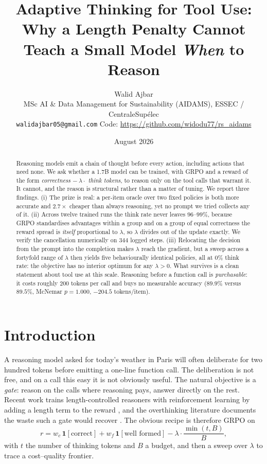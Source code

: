 \documentclass[10pt,twocolumn]{article}
\title{\vspace{-2.2em}\textbf{Adaptive Thinking for Tool Use:}\\[2pt]
\large Why a Length Penalty Cannot Teach a Small Model \emph{When} to Reason}
\author{Walid Ajbar\\[2pt]
\small MSc AI \& Data Management for Sustainability (AIDAMS), ESSEC / CentraleSup\'elec\\
\small \texttt{walidajbar05@gmail.com} \quad Code: \url{https://github.com/widodu77/rs_aidams}}
\date{\vspace{-0.6em}\small August 2026}
\newcommand{\lam}{\lambda}
\begin{document}
\maketitle

\begin{abstract}
\noindent
Reasoning models emit a chain of thought before every action, including actions
that need none. We ask whether a 1.7B model can be trained, with GRPO and a
reward of the form \emph{correctness $-\ \lam\cdot$ think tokens}, to reason only
on the tool calls that warrant it. It cannot, and the reason is structural rather
than a matter of tuning. We report three findings. (i) The prize is real: a
per-item oracle over two fixed policies is both more accurate and $2.7\times$
cheaper than always reasoning, yet no prompt we tried collects any of it.
(ii) Across twelve trained runs the think rate never leaves $96$--$99\%$, because
GRPO standardises advantages within a group and on a group of equal correctness
the reward spread is \emph{itself} proportional to $\lam$, so $\lam$ divides out
of the update exactly. We verify the cancellation numerically on $344$ logged
steps. (iii) Relocating the decision from the prompt into the completion makes
$\lam$ reach the gradient, but a sweep across a fortyfold range of $\lam$ then
yields five behaviourally identical policies, all at $0\%$ think rate: the
objective has no interior optimum for any $\lam>0$. What survives is a clean
statement about tool use at this scale. Reasoning before a function call is
\emph{purchasable}: it costs roughly $200$ tokens per call and buys no measurable
accuracy ($89.9\%$ versus $89.5\%$, McNemar $p{=}1.000$, $-204.5$ tokens/item).
\end{abstract}

\section{Introduction}

A reasoning model asked for today's weather in Paris will often deliberate for
two hundred tokens before emitting a one-line function call. The deliberation is
not free, and on a call this easy it is not obviously useful. The natural
objective is a \emph{gate}: reason on the calls where reasoning pays, answer
directly on the rest. Recent work trains length-controlled reasoners with
reinforcement learning by adding a length term to the reward
\cite{arora2025efficient,aggarwal2025l1}, and the overthinking literature
documents the waste such a gate would recover \cite{chen2024overthinking}. The
obvious recipe is therefore GRPO \cite{shao2024deepseekmath} on
\[
  r = w_c\,\mathbf{1}[\text{correct}] + w_f\,\mathbf{1}[\text{well formed}]
      - \lam \cdot \frac{\min(t,B)}{B},
\]
with $t$ the number of thinking tokens and $B$ a budget, and then a sweep over
$\lam$ to trace a cost--quality frontier.
\end{document}
